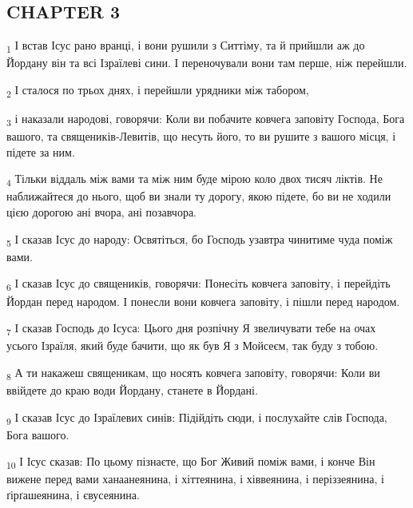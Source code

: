 \subsection{CHAPTER 3}
\begin{tcolorbox}
\textsubscript{1} І встав Ісус рано вранці, і вони рушили з Ситтіму, та й прийшли аж до Йордану він та всі Ізраїлеві сини. І переночували вони там перше, ніж перейшли.
\end{tcolorbox}
\begin{tcolorbox}
\textsubscript{2} І сталося по трьох днях, і перейшли урядники між табором,
\end{tcolorbox}
\begin{tcolorbox}
\textsubscript{3} і наказали народові, говорячи: Коли ви побачите ковчега заповіту Господа, Бога вашого, та священиків-Левитів, що несуть його, то ви рушите з вашого місця, і підете за ним.
\end{tcolorbox}
\begin{tcolorbox}
\textsubscript{4} Тільки віддаль між вами та між ним буде мірою коло двох тисяч ліктів. Не наближайтеся до нього, щоб ви знали ту дорогу, якою підете, бо ви не ходили цією дорогою ані вчора, ані позавчора.
\end{tcolorbox}
\begin{tcolorbox}
\textsubscript{5} І сказав Ісус до народу: Освятіться, бо Господь узавтра чинитиме чуда поміж вами.
\end{tcolorbox}
\begin{tcolorbox}
\textsubscript{6} І сказав Ісус до священиків, говорячи: Понесіть ковчега заповіту, і перейдіть Йордан перед народом. І понесли вони ковчега заповіту, і пішли перед народом.
\end{tcolorbox}
\begin{tcolorbox}
\textsubscript{7} І сказав Господь до Ісуса: Цього дня розпічну Я звеличувати тебе на очах усього Ізраїля, який буде бачити, що як був Я з Мойсеєм, так буду з тобою.
\end{tcolorbox}
\begin{tcolorbox}
\textsubscript{8} А ти накажеш священикам, що носять ковчега заповіту, говорячи: Коли ви ввійдете до краю води Йордану, станете в Йордані.
\end{tcolorbox}
\begin{tcolorbox}
\textsubscript{9} І сказав Ісус до Ізраїлевих синів: Підійдіть сюди, і послухайте слів Господа, Бога вашого.
\end{tcolorbox}
\begin{tcolorbox}
\textsubscript{10} І Ісус сказав: По цьому пізнаєте, що Бог Живий поміж вами, і конче Він вижене перед вами ханаанеянина, і хіттеянина, і хіввеянина, і періззеянина, і ґірґашеянина, і євусеянина.
\end{tcolorbox}
